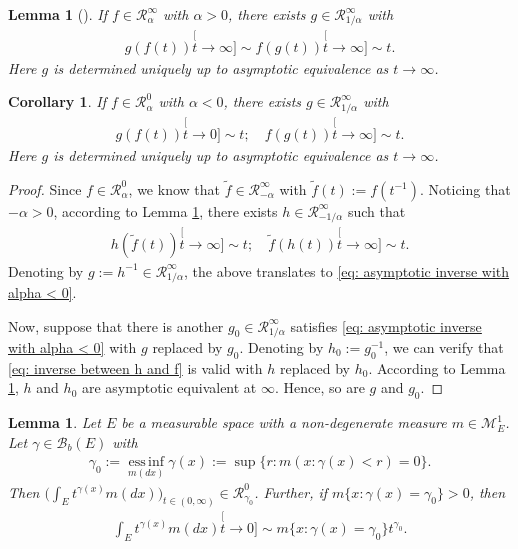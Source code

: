 \documentclass[UTF8]{pkuthss}
\theoremstyle{plain}
\newtheorem{lem}[thm]{Lemma}
\newtheorem{cor}[thm]{Corollary}
\theoremstyle{definition}
\numberwithin{equation}{section}
\begin{document}
\begin{lem}[{\cite[Theorem 1.5.12]{BinghamGoldieTeugels1989Regular}}] \label{lem: regularly variation and inverse}
	If $f \in \mathcal R_\alpha^\infty$ with $\alpha > 0$, there exists $g \in \mathcal R^\infty_{1/\alpha}$ with
\begin{align}
	g(f(t))
	\stackrel[t\to \infty]{}{\sim}
	f(g(t))
	\stackrel[t\to \infty]{}{\sim}
	t.
\end{align}
	Here $g$ is determined uniquely up to asymptotic equivalence as $t\to \infty$.
\end{lem}
\begin{cor} \label{cro: regularly varing and inverse with alpha < 0}
	If $f \in \mathcal R_\alpha^0$ with $\alpha < 0$, there exists $g \in \mathcal R^\infty_{1/\alpha}$ with
\begin{align} \label{eq: asymptotic inverse with alpha < 0}
	g(f(t))
	\stackrel[t\to 0]{}{\sim}
	t;
	\quad
	f(g(t))
	\stackrel[t\to \infty]{}{\sim}
	t.
\end{align}
	Here $g$ is determined uniquely up to asymptotic equivalence as $t\to \infty$.
\end{cor}
\begin{proof}
	Since $f \in \mathcal R_\alpha^0$, we know that $\tilde f \in \mathcal R_{-\alpha}^\infty$ with $\tilde f(t):= f(t^{-1})$.
	Noticing that $-\alpha > 0$, according to Lemma \ref{lem: regularly variation and inverse}, there exists $h \in \mathcal R_{-1/\alpha}^{\infty}$ such that
\begin{align} \label{eq: inverse between h and f}
	h(\tilde f(t))
	\stackrel[t\to \infty]{}{\sim}
	t;
	\quad
	\tilde f(h(t))
	\stackrel[t\to \infty]{}{\sim}
	t.
\end{align}
	Denoting by $g := h^{-1} \in \mathcal R_{1/\alpha}^\infty$, the above translates to \eqref{eq: asymptotic inverse with alpha < 0}.

	Now, suppose that there is another $g_0 \in \mathcal R_{1/\alpha}^\infty$ satisfies \eqref{eq: asymptotic inverse with alpha < 0} with $g$ replaced by $g_0$.
	Denoting by $h_0 := g_0^{-1}$, we can verify that \eqref{eq: inverse between h and f} is valid with $h$ replaced by $h_0$.
	According to Lemma \ref{lem: regularly variation and inverse}, $h$ and $h_0$ are asymptotic equivalent at $\infty$.
	Hence, so are $g$ and $g_0$.
\end{proof}

\begin{lem}\label{lem:regularly_variation_and_integration}
	Let $E$ be a measurable space with a non-degenerate measure $m \in \mathcal M^1_E$.
	Let $ \gamma \in \mathscr B_b(E)$ with
\begin{align}
	\gamma_0
	:= \operatorname*{ess\,inf}_{m(dx)} \gamma(x)
	:= \sup\{r:m(x:\gamma(x) < r) = 0\}.
\end{align}
	Then $\big(\int_E t^{\gamma(x)} m(dx)\big)_{t\in (0,\infty)} \in \mathcal R^0_{\gamma_0}$.
	Further, if $m\{x:\gamma(x) = \gamma_0\}>0$, then
\begin{align}
	\int_E t^{\gamma(x)} m(dx)
	\stackrel[t\to 0]{}{\sim}  m\{x:\gamma(x) = \gamma_0\} t^{\gamma_0}.
\end{align}
\end{lem}
\end{document}
